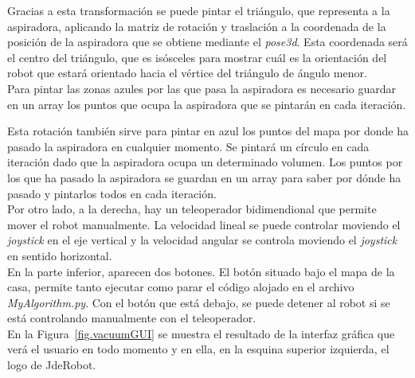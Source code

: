 Gracias a esta transformación se puede pintar el triángulo, que representa a la aspiradora, aplicando la matriz de rotación y traslación a la coordenada de la posición de la aspiradora que se obtiene mediante el \textit{pose3d}. Esta coordenada será el centro del triángulo, que es isósceles para mostrar cuál es la orientación del robot que estará orientado hacia el vértice del triángulo de ángulo menor.\\

Para pintar las zonas azules por las que pasa la aspiradora es necesario guardar en un array los puntos que ocupa la aspiradora que se pintarán en cada iteración. 



Esta rotación también sirve para pintar en azul los puntos del mapa por donde ha pasado la aspiradora en cualquier momento. Se pintará un círculo en cada iteración dado que la aspiradora ocupa un determinado volumen. Los puntos por los que ha pasado la aspiradora se guardan en un array para saber por dónde ha pasado y pintarlos todos en cada iteración.\\

Por otro lado, a la derecha, hay un teleoperador bidimendional que permite mover el robot manualmente. La velocidad lineal se puede controlar moviendo el \textit{joystick} en el eje vertical y la velocidad angular se controla moviendo el \textit{joystick} en sentido horizontal.\\

En la parte inferior, aparecen dos botones. El botón situado bajo el mapa de la casa, permite tanto ejecutar como parar el código alojado en el archivo \textit{MyAlgorithm.py}. Con el botón que está debajo, se puede detener al robot si se está controlando manualmente con el teleoperador.\\


En la Figura~\ref{fig.vacuumGUI} se muestra el resultado de la interfaz gráfica que verá el usuario en todo momento y en ella, en la esquina superior izquierda, el logo de JdeRobot.

